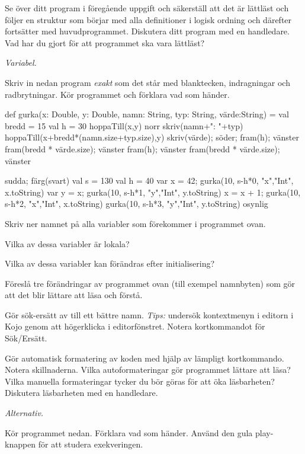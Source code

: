 \Subtask\Checkpoint Se över ditt program i föregående uppgift och säkerställ att det är lättläst och följer en struktur som börjar med alla definitioner i logisk ordning och därefter fortsätter med huvudprogrammet. Diskutera ditt program med en handledare. Vad har du gjort för att programmet ska vara lättläst?


\Task \emph{Variabel.}

\Subtask Skriv in nedan program \emph{exakt} som det står med blanktecken, indragningar och radbrytningar. Kör programmet och förklara vad som händer.

\begin{Code}
def gurka(x: Double,
          y: Double, namn: String,
          typ: String,
          värde:String) = {
  val bredd = 15
  val h = 30
  hoppaTill(x,y)
  norr
  skriv(namn+": "+typ)
  hoppaTill(x+bredd*(namn.size+typ.size),y)
  skriv(värde); söder; fram(h); vänster
  fram(bredd * värde.size); vänster
  fram(h); vänster
  fram(bredd * värde.size); vänster
}

sudda; färg(svart)
val s = 130
val h = 40
var x = 42; gurka(10, s-h*0, "x","Int", x.toString)
var y = x;  gurka(10, s-h*1, "y","Int", y.toString)
x = x + 1;  gurka(10, s-h*2, "x","Int", x.toString)
            gurka(10, s-h*3, "y","Int", y.toString)
osynlig
\end{Code}

\Subtask\Pen Skriv ner namnet på alla variabler som förekommer i programmet ovan.

\Subtask\Pen Vilka av dessa variabler är lokala?

\Subtask\Pen Vilka av dessa variabler kan förändras efter initialisering?

\Subtask\Pen Föreslå tre förändringar av programmet ovan (till exempel namnbyten) som gör att det blir lättare att läsa och förstå.

\Subtask Gör sök-ersätt av  till ett bättre namn. \emph{Tips:} undersök kontextmenyn i editorn i Kojo genom att högerklicka i editorfönstret. Notera kortkommandot för Sök/Ersätt.

\Subtask\Checkpoint Gör automatisk formatering av koden med hjälp av lämpligt kortkommando. Notera skillnaderna. Vilka autoformateringar gör programmet lättare att läsa? Vilka manuella formateringar tycker du bör göras för att öka läsbarheten? Diskutera läsbarheten med en handledare.

\Task \emph{Alternativ.}

\Subtask Kör programmet nedan. Förklara vad som händer. Använd den gula play-knappen för att studera exekveringen.

